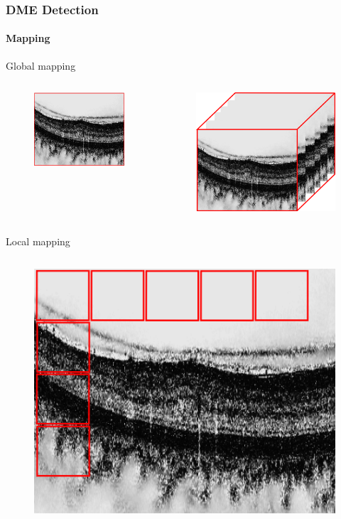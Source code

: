 \documentclass{beamer}
\begin{document}
\begin{frame}
  \frametitle{DME Detection}
  \framesubtitle{Mapping}
  \begin{block}{Global mapping}
    \begin{columns}
      \begin{column}{.5\linewidth}
        \begin{figure}
          \centering
          \includegraphics[width=.4\textwidth]{./images/global-2d.png}
        \end{figure}
      \end{column}
      \begin{column}{.5\linewidth}
        \begin{figure}
          \centering
          \includegraphics[width=.4\textwidth]{./images/global-3d.png}
        \end{figure}
      \end{column}
    \end{columns}
  \end{block}
  \begin{block}{Local mapping}
    \begin{columns}
      \begin{column}{.5\linewidth}
        \begin{figure}
          \centering
          \includegraphics[width=.4\textwidth]{./images/local-2d.png}

\end{figure}
\end{column}
\end{columns}
\end{block}
\end{frame}
\end{document}
